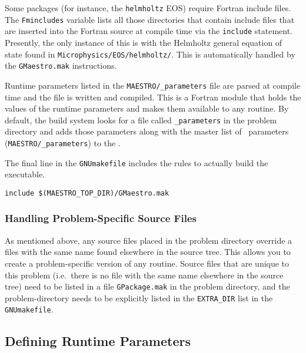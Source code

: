 Some packages (for instance, the {\tt helmholtz}
EOS) require Fortran include files.  The {\tt Fmincludes} variable
lists all those directories that contain include files that are
inserted into the Fortran source at compile time via the {\tt include}
statement.  Presently, the only instance of this is with the Helmholtz
general equation of state found in {\tt Microphysics/EOS/helmholtz/}.  This is
automatically handled by the {\tt GMaestro.mak} instructions.

Runtime parameters listed in the {\tt MAESTRO/\_parameters} file are
parsed at compile time and the file  is written and
compiled.  This is a Fortran module that holds the values of the
runtime parameters and makes them available to any routine.  By
default, the build system looks for a file called {\tt \_parameters}
in the problem directory and adds those parameters along with the
master list of \maestro\ parameters ({\tt MAESTRO/\_parameters}) to
the .

The final line in the {\tt GNUmakefile} includes the rules to actually
build the executable.
\begin{lstlisting}[language={[gnu]make},mathescape=false]
  include $(MAESTRO_TOP_DIR)/GMaestro.mak
\end{lstlisting}


\subsubsection{Handling Problem-Specific Source Files}

As mentioned above, any source files placed in the problem directory
override a files with the same name found elsewhere in the source
tree.  This allows you to create a problem-specific version of any
routine.  Source files that are unique to this problem (i.e.\ there is
no file with the same name elsewhere in the source tree) need to be
listed in a file {\tt GPackage.mak} in the problem directory, and
the problem-directory needs to be explicitly listed in the {\tt EXTRA\_DIR}
list in the {\tt GNUmakefile}.


\subsection{Defining Runtime Parameters}

\label{sec:def_runtime_param}

